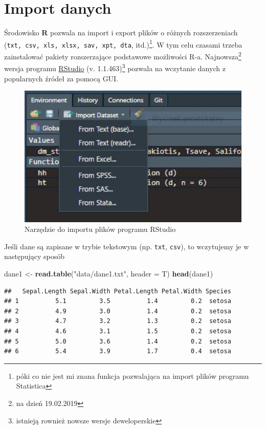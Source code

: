 \documentclass[
]{book}
\newenvironment{Shaded}{\begin{snugshade}}{\end{snugshade}}
\newcommand{\DataTypeTok}[1]{\textcolor[rgb]{0.13,0.29,0.53}{#1}}
\newcommand{\KeywordTok}[1]{\textcolor[rgb]{0.13,0.29,0.53}{\textbf{#1}}}
\newcommand{\NormalTok}[1]{#1}
\newcommand{\StringTok}[1]{\textcolor[rgb]{0.31,0.60,0.02}{#1}}
\theoremstyle{plain}
\theoremstyle{definition}
\theoremstyle{definition}
\theoremstyle{definition}
\theoremstyle{definition}
\theoremstyle{remark}
\begin{document}
\hypertarget{roz1}{%
\chapter{Import danych}\label{roz1}}

Środowisko \textbf{R} pozwala na import i export plików o różnych rozszerzeniach (\texttt{txt,\ csv,\ xls,\ xlsx,\ sav,\ xpt,\ dta}, itd.)\footnote{póki co nie jest mi znana funkcja pozwalająca na import plików programu Statistica}. W tym celu czasami trzeba zainstalować pakiety rozszerzające podstawowe możliwości R-a. Najnowsza\footnote{na dzień 19.02.2019} wersja programu \href{https://www.rstudio.com}{RStudio} (v. 1.1.463)\footnote{istnieją rownież nowsze wersje deweloperskie} pozwala na wczytanie danych z popularnych źródeł za pomocą GUI.

\begin{figure}
\includegraphics[width=4.77in]{images/import} \caption{Narzędzie do importu plików programu RStudio}\label{fig:import1}
\end{figure}

Jeśli dane są zapisane w trybie tekstowym (np. \texttt{txt}, \texttt{csv}), to wczytujemy je w następujący sposób

\begin{Shaded}
\begin{Highlighting}[]
\NormalTok{dane1 <-}\StringTok{ }\KeywordTok{read.table}\NormalTok{(}\StringTok{"data/dane1.txt"}\NormalTok{, }\DataTypeTok{header =}\NormalTok{ T)}
\KeywordTok{head}\NormalTok{(dane1)}
\end{Highlighting}
\end{Shaded}

\begin{verbatim}
##   Sepal.Length Sepal.Width Petal.Length Petal.Width Species
## 1          5.1         3.5          1.4         0.2  setosa
## 2          4.9         3.0          1.4         0.2  setosa
## 3          4.7         3.2          1.3         0.2  setosa
## 4          4.6         3.1          1.5         0.2  setosa
## 5          5.0         3.6          1.4         0.2  setosa
## 6          5.4         3.9          1.7         0.4  setosa
\end{verbatim}
\end{document}
